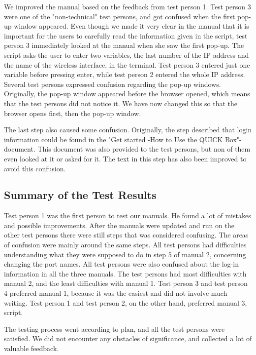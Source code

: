 We improved the manual based on the feedback from test person 1. Test person 3 were one of the "non-technical" test persons, and got confused when the first pop-up window appeared. Even though we made it very clear in the manual that it is important for the users to carefully read the information given in the script, test person 3 immediately looked at the manual when she saw the first pop-up. The script asks the user to enter two variables, the last number of the IP address and the name of the wireless interface, in the terminal. Test person 3 entered just one variable before pressing enter, while test person 2 entered the whole IP address. 
Several test persons expressed confusion regarding the pop-up windows. Originally, the pop-up window appeared before the browser opened, which means that the test persons did not notice it. We have now changed this so that the browser opens first, then the pop-up window. 

The last step also caused some confusion. Originally, the step described that login information could be found in the "Get started -How to Use the QUICK Box"-document. This document was also provided to the test persons, but non of them even looked at it or asked for it. The text in this step has also been improved to avoid this confusion.

\subsection{Summary of the Test Results}
Test person 1 was the first person to test our manuals. He found a lot of mistakes and possible improvements. After the manuals were updated and run on the other test persons there were still steps that was considered confusing. The areas of confusion were mainly around the same steps. All test persons had difficulties understanding what they were supposed to do in step 5 of manual 2, concerning changing the port names. All test persons were also confused about the log-in information in all the three manuals. The test persons had most difficulties with manual 2, and the least difficulties with manual 1. Test person 3 and test person 4 preferred manual 1, because it was the easiest and did not involve much writing. Test person 1 and test person 2, on the other hand, preferred manual 3, script. 

The testing process went according to plan, and all the test persons were satisfied. We did not encounter any obstacles of significance, and collected a lot of valuable feedback.  